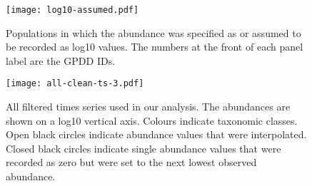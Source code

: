 \documentclass[11pt]{article}
\begin{document}
\clearpage


\begin{figure}[htbp]
\begin{center}
\texttt{[image: log10-assumed.pdf]} \caption{Populations in which the abundance was specified as or assumed to be recorded as log10 values. The numbers at the front of each panel label are the GPDD IDs.}
    \label{fig:log10-assumed}
\end{center}
\end{figure}



\begin{figure}[htbp]
\begin{center}
\texttt{[image: all-clean-ts-3.pdf]} \caption{All filtered times series used in our analysis. The abundances are shown on a log10 vertical axis. Colours indicate taxonomic classes. Open black circles indicate abundance values that were interpolated. Closed black circles indicate single abundance values that were recorded as zero but were set to the next lowest observed abundance.}
    \label{fig:all-ts}
\end{center}
\end{figure}
\end{document}
